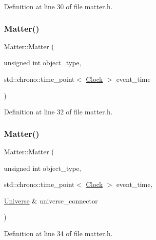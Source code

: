 Definition at line 30 of file matter.\+h.

\mbox{\label{class_matter_ae15b0b8d811fb2ffd01ea039777d1b95}} 
\subsubsection{\texorpdfstring{Matter()}{Matter()}\hspace{0.1cm}{\footnotesize\ttfamily [3/4]}}
{\footnotesize\ttfamily Matter\+::\+Matter (\begin{DoxyParamCaption}\item[{unsigned int}]{object\+\_\+type,  }\item[{std\+::chrono\+::time\+\_\+point$<$ \hyperlink{universe_8h_a0ef8d951d1ca5ab3cfaf7ab4c7a6fd80}{Clock} $>$}]{event\+\_\+time }\end{DoxyParamCaption})\hspace{0.3cm}{\ttfamily [inline]}}



Definition at line 32 of file matter.\+h.

\mbox{\label{class_matter_a724543a0439d3099f5fc0eae68110b75}} 
\subsubsection{\texorpdfstring{Matter()}{Matter()}\hspace{0.1cm}{\footnotesize\ttfamily [4/4]}}
{\footnotesize\ttfamily Matter\+::\+Matter (\begin{DoxyParamCaption}\item[{unsigned int}]{object\+\_\+type,  }\item[{std\+::chrono\+::time\+\_\+point$<$ \hyperlink{universe_8h_a0ef8d951d1ca5ab3cfaf7ab4c7a6fd80}{Clock} $>$}]{event\+\_\+time,  }\item[{\hyperlink{class_universe}{Universe} \&}]{universe\+\_\+connector }\end{DoxyParamCaption})\hspace{0.3cm}{\ttfamily [inline]}}



Definition at line 34 of file matter.\+h.

